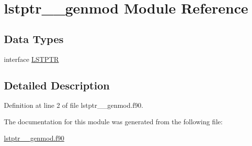 \hypertarget{classlstptr____genmod}{\section{lstptr\+\_\+\+\_\+genmod Module Reference}
\label{classlstptr____genmod}
}
\subsection*{Data Types}
\begin{DoxyCompactItemize}
\item 
interface \hyperlink{interfacelstptr____genmod_1_1LSTPTR}{L\+S\+T\+P\+T\+R}
\end{DoxyCompactItemize}


\subsection{Detailed Description}


Definition at line 2 of file lstptr\+\_\+\+\_\+genmod.\+f90.



The documentation for this module was generated from the following file\+:\begin{DoxyCompactItemize}
\item 
\hyperlink{lstptr____genmod_8f90}{lstptr\+\_\+\+\_\+genmod.\+f90}\end{DoxyCompactItemize}
